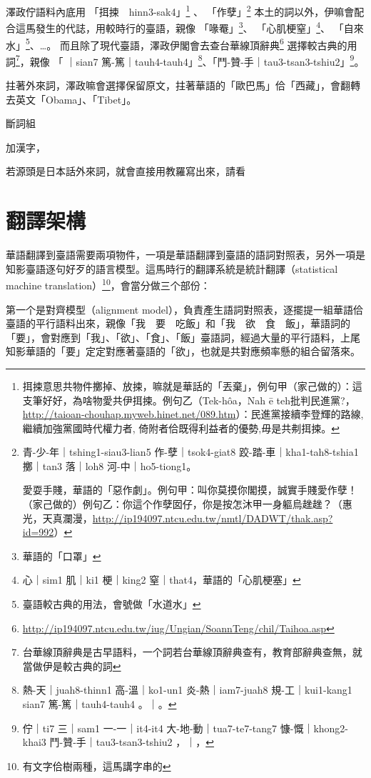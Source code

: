 \documentclass[final,oneside,onecolumn,12pt,a4paper]{book}%
\begin{document}
澤政佇語料內底用
「挕捒　hinn3-sak4」\footnote{挕捒意思共物件擲掉、放捒，嘛就是華話的「丟棄」，例句甲（家己做的）：這支筆好好，為啥物愛共伊挕捒。例句乙（Tek-hôa，Nah ē teh批判民進黨?，\url{http://taioan-chouhap.myweb.hinet.net/089.htm}）：民進黨接續李登輝的路線, 繼續加強黨國時代權力者, 倚附者佮既得利益者的優勢,毋是共刜挕捒。}
、
「作孽」\footnote{
青-少-年｜tshing1-siau3-lian5 作-孽｜tsok4-giat8 跤-踏-車｜kha1-tah8-tshia1 擲｜tan3 落｜loh8 河-中｜ho5-tiong1。

愛耍手賤，華語的「惡作劇」。例句甲：叫你莫摸你閣摸，誠實手賤愛作孽！（家己做的）例句乙：你這个作孽囡仔，你是按怎沐甲一身軀烏趖趖？（惠光，天真瀾漫，\url{http://ip194097.ntcu.edu.tw/nmtl/DADWT/thak.asp?id=992}）}
本土的詞以外，伊嘛會配合這馬發生的代誌，用較時行的臺語，親像
「喙罨」\footnote{華語的「口罩」}、
「心肌梗窒」\footnote{心｜sim1 肌｜ki1 梗｜king2 窒｜that4，華語的「心肌梗塞」}、
「自來水」\footnote{臺語較古典的用法，會號做「水道水」}、…。
而且除了現代臺語，澤政伊閣會去查台華線頂辭典\footnote{\url{http://ip194097.ntcu.edu.tw/iug/Ungian/SoannTeng/chil/Taihoa.asp}}
選擇較古典的用詞\footnote{台華線頂辭典是古早語料，一个詞若台華線頂辭典查有，教育部辭典查無，就當做伊是較古典的詞}，親像
「𤺪｜sian7 篤-篤｜tauh4-tauh4」\footnote{熱-天｜juah8-thinn1 高-溫｜ko1-un1 炎-熱｜iam7-juah8 規-工｜kui1-kang1 𤺪｜sian7 篤-篤｜tauh4-tauh4 。｜。}、「鬥-贊-手｜tau3-tsan3-tshiu2」\footnote{佇｜ti7 三｜sam1 一-一｜it4-it4 大-地-動｜tua7-te7-tang7 慷-慨｜khong2-khai3 鬥-贊-手｜tau3-tsan3-tshiu2 ，｜，}。

拄著外來詞，澤政嘛會選擇保留原文，拄著華語的「歐巴馬」佮「西藏」，會翻轉去英文「Obama」、「Tibet」。

斷詞組

加漢字，

若源頭是日本話外來詞，就會直接用教羅寫出來，請看

\section{翻譯架構}
\label{節：翻譯架構}
華語翻譯到臺語需要兩項物件，一項是華語翻譯到臺語的語詞對照表，另外一項是知影臺語逐句好歹的語言模型。這馬時行的翻譯系統是統計翻譯（statistical machine translation）\footnote{有文字佮樹兩種，這馬講字串的}，會當分做三个部份：

第一个是對齊模型（alignment model），負責產生語詞對照表，逐擺提一組華語佮臺語的平行語料出來，親像「我　要　吃飯」和「我　欲　食　飯」，華語詞的「要」，會對應到「我」、「欲」、「食」、「飯」臺語詞，經過大量的平行語料，上尾知影華語的「要」定定對應著臺語的「欲」，也就是共對應頻率懸的組合留落來。
\end{document}
